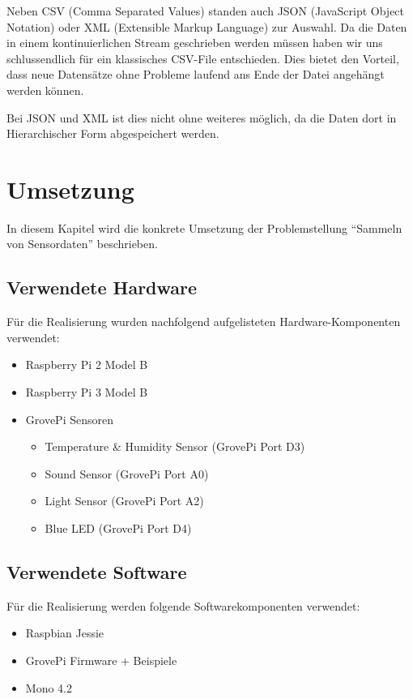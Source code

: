 Neben CSV (Comma Separated Values) standen auch JSON (JavaScript Object Notation) oder XML (Extensible Markup Language) zur Auswahl. Da die Daten in einem kontinuierlichen Stream geschrieben werden müssen haben wir uns schlussendlich für ein klassisches CSV-File entschieden. Dies bietet den Vorteil, dass neue Datensätze ohne Probleme laufend ans Ende der Datei angehängt werden können.

Bei JSON und XML ist dies nicht ohne weiteres möglich, da die Daten dort in Hierarchischer Form abgespeichert werden.


\section{Umsetzung}
In diesem Kapitel wird die konkrete Umsetzung der Problemstellung "`Sammeln von Sensordaten"' beschrieben.

\subsection{Verwendete Hardware}
Für die Realisierung wurden nachfolgend aufgelisteten Hardware-Komponenten verwendet:
\begin{itemize}
\item Raspberry Pi 2 Model B
\item Raspberry Pi 3 Model B
\item GrovePi Sensoren
\begin{itemize}
\item Temperature \& Humidity Sensor (GrovePi Port D3)
\item Sound Sensor (GrovePi Port A0)
\item Light Sensor (GrovePi Port A2)
\item Blue LED (GrovePi Port D4)
\end{itemize}
\end{itemize}


\subsection{Verwendete Software}
Für die Realisierung werden folgende Softwarekomponenten verwendet:

\begin{itemize}
\item Raspbian Jessie
\item GrovePi Firmware + Beispiele
\item Mono 4.2
\end{itemize}

